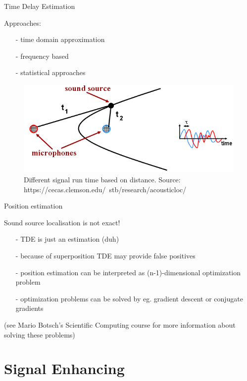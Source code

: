 \documentclass{beamer}
\begin{document}
	\begin{frame}{Time Delay Estimation}
		\begin{alertblock}{Approaches:}
			\begin{itemize}[leftmargin=*,labelindent=16pt]
				\item[-] time domain approximation
				\item[-] frequency based
				\item[-] statistical approaches
			\end{itemize}
		\end{alertblock}
		
		\begin{figure}[ht]
			\centering
			\includegraphics[width=.8\linewidth]{Bilder/ssl.png}
			\caption{Different signal run time based on distance. Source: https://cecas.clemson.edu/~stb/research/acousticloc/}
		\end{figure}
	\end{frame}
	
	\begin{frame}{Position estimation}
		\begin{alertblock}{Sound source localisation is not exact!}
			\begin{itemize}
				\item[-] TDE is just an estimation (duh)
				\item[-] because of superposition TDE may provide false positives
				\item[-] position estimation can be interpreted as (n-1)-dimensional optimization problem
				\item[-] optimization problems can be solved by eg. gradient descent or conjugate gradients
			\end{itemize}
		\end{alertblock}
		(see Mario Botsch's Scientific Computing course for more information about solving these problems)
	\end{frame}
	
	\section{Signal Enhancing}%
	
\end{document}
